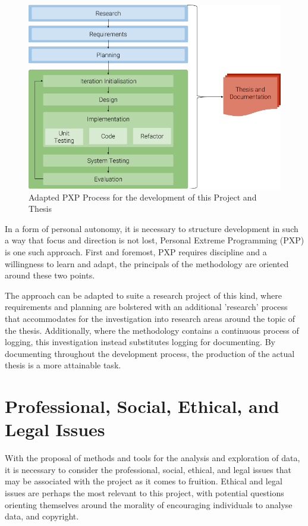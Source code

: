 \documentclass[10pt]{report}
\begin{document}
\begin{figure}[h!]
  \centering
  \includegraphics[scale=0.5]{pxp_process}
  \caption{Adapted PXP Process for the development of this Project and Thesis\label{fig:pxp_process}}
\end{figure}

In a form of personal autonomy, it is necessary to structure development in such a way that focus and direction is not lost, Personal Extreme Programming (PXP) is one such approach. First and foremost, PXP requires discipline and a willingness to learn and adapt, the principals of the methodology are oriented around these two points. ~\cite{Dzhurov2009-sr}

The approach can be adapted to suite a research project of this kind, where requirements and planning are bolstered with an additional 'research' process that accommodates for the investigation into research areas around the topic of the thesis. Additionally, where the methodology contains a continuous process of logging, this investigation instead substitutes logging for documenting. By documenting throughout the development process, the production of the actual thesis is a more attainable task.


\section{Professional, Social, Ethical, and Legal Issues}

With the proposal of methods and tools for the analysis and exploration of data, it is necessary to consider the professional, social, ethical, and legal issues that may be associated with the project as it comes to fruition. Ethical and legal issues are perhaps the most relevant to this project, with potential questions orienting themselves around the morality of encouraging individuals to analyse data, and copyright.
\end{document}
